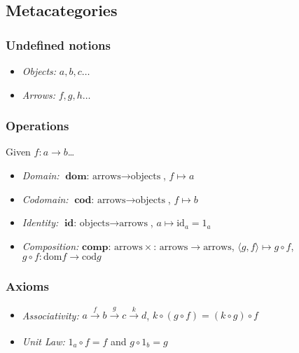 \subsection{Metacategories}\label{metacategory}

\subsubsection{Undefined notions}
\begin{itemize}
  \item \emph{Objects:} $a,b,c\dots$
  \item \emph{Arrows:} $f,g,h\dots$
\end{itemize}

\subsubsection{Operations}
Given $f: a \rightarrow b$\dots
\begin{itemize}
  \item \emph{Domain:} $\textbf{dom}\textrm{: arrows} \rightarrow \textrm{objects}$, $f \mapsto a$
  \item \emph{Codomain:} $\textbf{cod}\textrm{: arrows} \rightarrow \textrm{objects}$, $f \mapsto b$
  \item \emph{Identity:} $\textbf{id}\textrm{: objects} \rightarrow \textrm{arrows}$, $a \mapsto \textrm{id}_a = 1_a$
  \item \emph{Composition:} $\textbf{comp}\textrm{: arrows} \times \textrm{: arrows} \rightarrow \textrm{arrows}$, $\langle g, f \rangle \mapsto g \circ f$, \newline $g \circ f: \textrm{dom} f \rightarrow \textrm{cod} g$
\end{itemize}
\begin{figure}[H]
\centering

\end{figure}

\subsubsection{Axioms}
\begin{itemize}
  \item \emph{Associativity:} $a \xrightarrow[]{f} b \xrightarrow[]{g} c \xrightarrow[]{k} d$, $k \circ (g \circ f) = (k \circ g) \circ f$
  \begin{figure}[H]
  \centering
  
  \end{figure}
  \item \emph{Unit Law:} $1_a \circ f = f$ and $g \circ 1_b = g$
  \begin{figure}[H]
  \centering
  
  \end{figure}
\end{itemize}